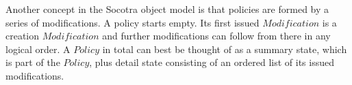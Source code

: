 Another concept in the Socotra object model is that policies are formed by a series of modifications. A
policy starts empty. Its first issued $Modification$ is a creation $Modification$ and further modifications
can follow from there in any logical order. A $Policy$ in total can best be thought of as a summary state,
which is part of the $Policy$, plus detail state consisting of an ordered list of its issued modifications.

